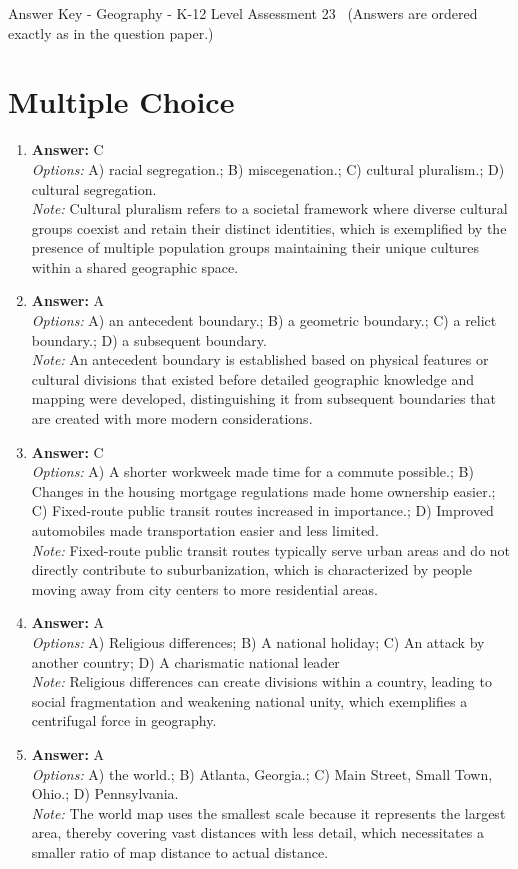 \documentclass[12pt]{article}
\begin{document}
\begin{center}
Answer Key - Geography - K-12 Level Assessment 23 \
\small (Answers are ordered exactly as in the question paper.)
\end{center}

\section*{Multiple Choice}
\begin{enumerate}[label=\arabic*.]
\item \textbf{Answer:} C
\\ \textit{Options:} A) racial segregation.; B) miscegenation.; C) cultural pluralism.; D) cultural segregation.
\\ \textit{Note:} Cultural pluralism refers to a societal framework where diverse cultural groups coexist and retain their distinct identities, which is exemplified by the presence of multiple population groups maintaining their unique cultures within a shared geographic space.
\item \textbf{Answer:} A
\\ \textit{Options:} A) an antecedent boundary.; B) a geometric boundary.; C) a relict boundary.; D) a subsequent boundary.
\\ \textit{Note:} An antecedent boundary is established based on physical features or cultural divisions that existed before detailed geographic knowledge and mapping were developed, distinguishing it from subsequent boundaries that are created with more modern considerations.
\item \textbf{Answer:} C
\\ \textit{Options:} A) A shorter workweek made time for a commute possible.; B) Changes in the housing mortgage regulations made home ownership easier.; C) Fixed-route public transit routes increased in importance.; D) Improved automobiles made transportation easier and less limited.
\\ \textit{Note:} Fixed-route public transit routes typically serve urban areas and do not directly contribute to suburbanization, which is characterized by people moving away from city centers to more residential areas.
\item \textbf{Answer:} A
\\ \textit{Options:} A) Religious differences; B) A national holiday; C) An attack by another country; D) A charismatic national leader
\\ \textit{Note:} Religious differences can create divisions within a country, leading to social fragmentation and weakening national unity, which exemplifies a centrifugal force in geography.
\item \textbf{Answer:} A
\\ \textit{Options:} A) the world.; B) Atlanta, Georgia.; C) Main Street, Small Town, Ohio.; D) Pennsylvania.
\\ \textit{Note:} The world map uses the smallest scale because it represents the largest area, thereby covering vast distances with less detail, which necessitates a smaller ratio of map distance to actual distance.
\end{enumerate}
\end{document}

